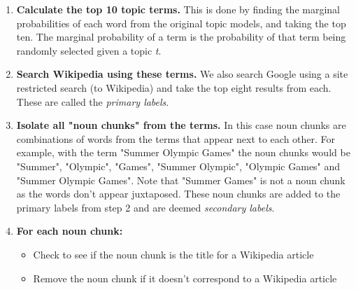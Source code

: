 \documentclass[12pt]{article}
\begin{document}
\begin{enumerate}
	\item \textbf{Calculate the top 10 topic terms.} This is done by finding the marginal probabilities of each word from the original topic models, and taking the top ten. The marginal probability of a term is the probability of that term being randomly selected given a topic \emph{t}. \\
	\item \textbf{Search Wikipedia using these terms.} We also search Google\cite{google} using a site restricted search (to Wikipedia) and take the top eight results from each. These are called the \emph{primary labels}. \\
	\item \textbf{Isolate all "noun chunks" from the terms.} In this case noun chunks are combinations of words from the terms that appear next to each other. For example, with the term "Summer Olympic Games" the noun chunks would be "Summer", "Olympic", "Games", "Summer Olympic", "Olympic Games" and "Summer Olympic Games". Note that "Summer Games" is not a noun chunk as the words don't appear juxtaposed. These noun chunks are added to the primary labels from step 2 and are deemed \emph{secondary labels}. \\
	\item \textbf{For each noun chunk:} 
		\begin{itemize}
			\item Check to see if the noun chunk is the title for a Wikipedia article
			\item Remove the noun chunk if it doesn't correspond to a Wikipedia article\\
		\end{itemize}
		

\end{enumerate}
\end{document}
